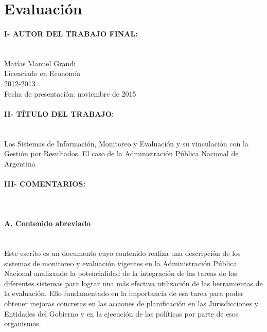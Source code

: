\newpage
\section*{Evaluación}

\paragraph{I-  AUTOR DEL TRABAJO FINAL:} \mbox{}\\
Matías Manuel Grandi \\
Licenciado en Economía \\
2012-2013\\
Fecha de presentación: noviembre de 2015
\paragraph{II- TÍTULO DEL TRABAJO:} \mbox{}\\
Los Sistemas de Información, Monitoreo y Evaluación y su vinculación con la Gestión por Resultados. El caso de la Administración Pública Nacional de Argentina
\paragraph{III- COMENTARIOS:} \mbox{}\\
\paragraph{A. Contenido abreviado} \mbox{} \\
Este escrito es un documento cuyo contenido realiza una descripción de los sistemas de monitoreo y evaluación vigentes en la Administración Pública Nacional analizando la potencialidad de la integración de las tareas de los diferentes sistemas para lograr una más efectiva utilización de las herramientas de la evaluación. Ello fundamentado en la importancia de esa tarea para poder obtener mejoras concretas en las acciones de planificación en las Jurisdicciones y Entidades del Gobierno y en la ejecución de las políticas por parte de esos organismos.\\
